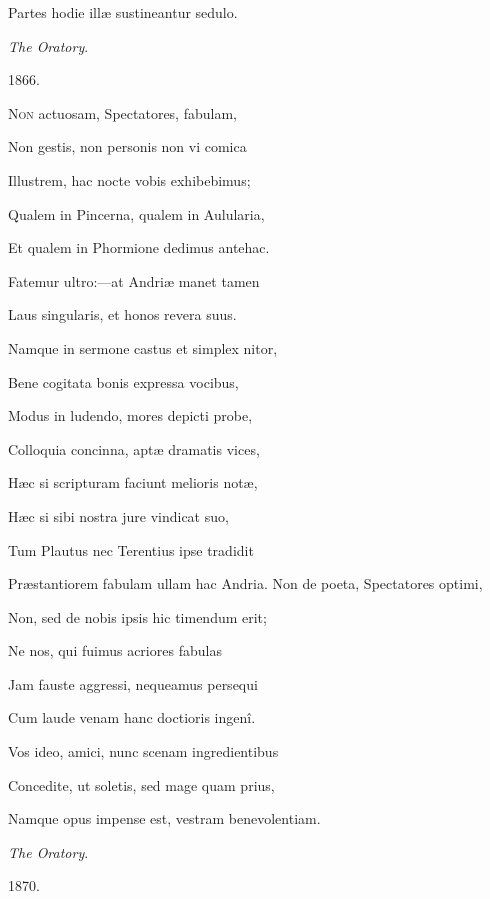 Partes hodie illæ sustineantur sedulo.

\emph{The Oratory}.

1866.


N\textsc{on} actuosam, Spectatores, fabulam,

Non gestis, non personis non vi comica

Illustrem, hac nocte vobis exhibebimus;

Qualem in Pincerna, qualem in Aulularia,

Et qualem in Phormione dedimus antehac.

Fatemur ultro:—at Andriæ manet tamen

Laus singularis, et honos revera suus.

Namque in sermone castus et simplex nitor,

Bene cogitata bonis expressa vocibus,

Modus in ludendo, mores depicti probe,

Colloquia concinna, aptæ dramatis vices,

Hæc si scripturam faciunt melioris notæ,

Hæc si sibi nostra jure vindicat suo,

Tum Plautus nec Terentius ipse tradidit

Præstantiorem fabulam ullam hac Andria. Non de poeta, Spectatores optimi,

Non, sed de nobis ipsis hic timendum erit;

Ne nos, qui fuimus acriores fabulas

Jam fauste aggressi, nequeamus persequi

Cum laude venam hanc doctioris ingenî.

Vos ideo, amici, nunc scenam ingredientibus

Concedite, ut soletis, sed mage quam prius,

Namque opus impense est, vestram benevolentiam.

\emph{The Oratory}.

1870.
